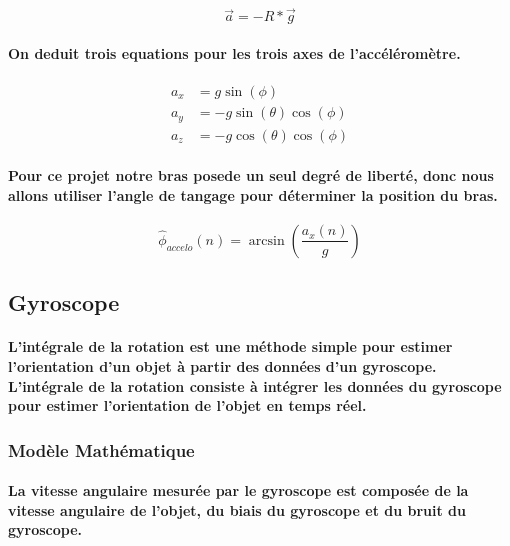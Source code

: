 \begin{equation*}
	\vec{a} = -R * \vec{g}
\end{equation*}

\paragraph{On deduit trois equations pour les trois axes de l'accéléromètre.}

\begin{align*}
	a_x &= g \sin(\phi) \\
	a_y &= -g \sin(\theta) \cos(\phi)\\
	a_z &= -g \cos(\theta) \cos(\phi)
\end{align*}

\paragraph{Pour ce projet notre bras posede un seul degré de liberté, donc nous allons utiliser l'angle de tangage pour déterminer la position du bras.}


\begin{equation}
	\hat{\phi}_{accelo}(n) = \arcsin\left(\frac{a_x(n)}{g}\right)
\end{equation}

\paragraph{}
\subsection{Gyroscope}

\paragraph{L'intégrale de la rotation est une méthode simple pour estimer l'orientation d'un objet à partir des données d'un gyroscope. L'intégrale de la rotation consiste à intégrer les données du gyroscope pour estimer l'orientation de l'objet en temps réel.}

\subsubsection{Modèle Mathématique}

\paragraph{La vitesse angulaire mesurée par le gyroscope est composée de la vitesse angulaire de l'objet, du biais du gyroscope et du bruit du gyroscope.}


